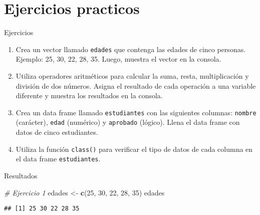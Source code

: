 \documentclass[
  ignorenonframetext,
]{beamer}
\newenvironment{Shaded}{\begin{snugshade}}{\end{snugshade}}
\newcommand{\CommentTok}[1]{\textcolor[rgb]{0.56,0.35,0.01}{\textit{#1}}}
\newcommand{\DecValTok}[1]{\textcolor[rgb]{0.00,0.00,0.81}{#1}}
\newcommand{\FunctionTok}[1]{\textcolor[rgb]{0.13,0.29,0.53}{\textbf{#1}}}
\newcommand{\NormalTok}[1]{#1}
\newcommand{\OtherTok}[1]{\textcolor[rgb]{0.56,0.35,0.01}{#1}}
\begin{document}
\section{Ejercicios practicos}\label{ejercicios-practicos}

\begin{frame}[fragile]{Ejercicios}
\label{ejercicios}
\begin{enumerate}
\item
  Crea un vector llamado \texttt{edades} que contenga las edades de
  cinco personas. Ejemplo: 25, 30, 22, 28, 35. Luego, muestra el vector
  en la consola.
\item
  Utiliza operadores aritméticos para calcular la suma, resta,
  multiplicación y división de dos números. Asigna el resultado de cada
  operación a una variable diferente y muestra los resultados en la
  consola.
\item
  Crea un data frame llamado \texttt{estudiantes} con las siguientes
  columnas: \texttt{nombre} (carácter), \texttt{edad} (numérico) y
  \texttt{aprobado} (lógico). Llena el data frame con datos de cinco
  estudiantes.
\item
  Utiliza la función \texttt{class()} para verificar el tipo de datos de
  cada columna en el data frame \texttt{estudiantes}.
\end{enumerate}
\end{frame}

\begin{frame}[fragile]{Resultados}
\label{resultados}
\begin{Shaded}
\begin{Highlighting}[]
\CommentTok{\# Ejercicio 1}
\NormalTok{edades }\OtherTok{\textless{}{-}} \FunctionTok{c}\NormalTok{(}\DecValTok{25}\NormalTok{, }\DecValTok{30}\NormalTok{, }\DecValTok{22}\NormalTok{, }\DecValTok{28}\NormalTok{, }\DecValTok{35}\NormalTok{)}
\NormalTok{edades}
\end{Highlighting}
\end{Shaded}

\begin{verbatim}
## [1] 25 30 22 28 35
\end{verbatim}
\end{frame}
\end{document}

